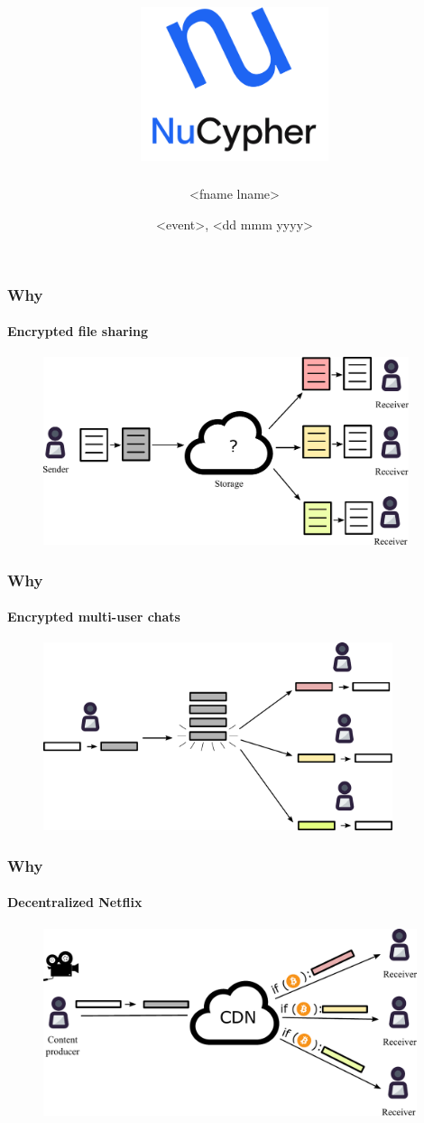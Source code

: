 \documentclass[xetex,mathsans,sans,aspectratio=169]{beamer}
\title[NuCypher]{\includegraphics[width=5.5cm]{pdf/nucypher_logo.pdf}}
\author[<fname lname>]{<fname lname>}
\date[<dd mmm yyyy>]{<event>, <dd mmm yyyy>}
\begin{document}
    \begin{frame}
        \titlepage
    \end{frame}

    \begin{frame}
        \frametitle{Why}
        \framesubtitle{Encrypted file sharing}
        \begin{figure}
            \centering
            \includegraphics[height=5.5cm]{pdf/file-sharing.pdf}
        \end{figure}
    \end{frame}

    \begin{frame}
        \frametitle{Why}
        \framesubtitle{Encrypted multi-user chats}
        \begin{figure}
            \centering
            \includegraphics[height=5.5cm]{pdf/chats.pdf}
        \end{figure}
    \end{frame}

    \begin{frame}
        \frametitle{Why}
        \framesubtitle{Decentralized Netflix}
        \begin{figure}
            \centering
            \includegraphics[height=5.5cm]{pdf/streams.pdf}
        \end{figure}
    \end{frame}
\end{document}
